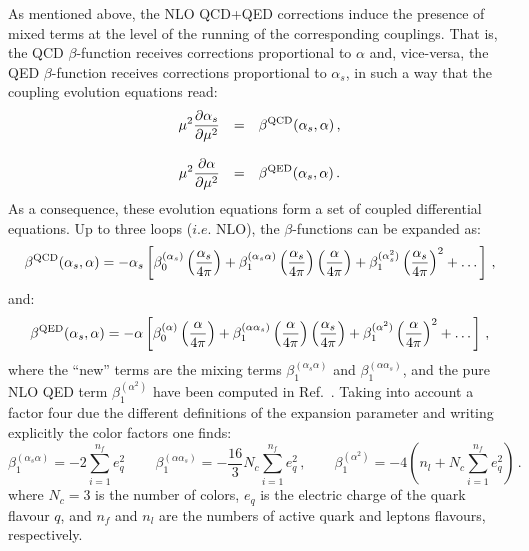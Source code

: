 As mentioned above, the NLO QCD+QED corrections induce the presence of
mixed terms at the level of the running of the corresponding
couplings.
%
That is, the QCD $\beta$-function receives corrections proportional to
$\alpha$ and, vice-versa, the QED $\beta$-function receives
corrections proportional to $\alpha_s$, in such a way that the
coupling evolution equations read:
\begin{equation}\label{CoupledEq}
\begin{array}{rcl}
\displaystyle \mu^2\frac{\partial \alpha_s}{\partial \mu^2} &=& \displaystyle
                                                \beta^{\rm QCD}(\alpha_s,\alpha)\,,\\
\\
\displaystyle \mu^2\frac{\partial \alpha}{\partial \mu^2} &=& \displaystyle \beta^{\rm QED}(\alpha_s,\alpha)\,.
\end{array}
\end{equation}
As a consequence, these evolution equations form a set of coupled
differential equations. Up to three loops ($i.e.$ NLO), the
$\beta$-functions can be expanded as:
\begin{equation}
\beta^{\rm QCD}(\alpha_s,\alpha) = -\alpha_s\left[\beta_0^{(\alpha_s)}\left(\frac{\alpha_s}{4\pi}\right)+\beta_1^{(\alpha_s\alpha)}\left(\frac{\alpha_s}{4\pi}\right) \left(\frac{\alpha}{4\pi}\right)+\beta_1^{(\alpha_s^2)}\left(\frac{\alpha_s}{4\pi}\right)^2+\dots\right]\,,
\end{equation}
and:
\begin{equation}
\beta^{\rm QED}(\alpha_s,\alpha) = -\alpha\left[\beta_0^{(\alpha)}\left(\frac{\alpha}{4\pi}\right)+\beta_1^{(\alpha\alpha_s)}\left(\frac{\alpha}{4\pi}\right) \left(\frac{\alpha_s}{4\pi}\right)+\beta_1^{(\alpha^2)}\left(\frac{\alpha}{4\pi}\right)^2+\dots\right]\,,
\end{equation}
where the ``new'' terms are the mixing terms
$\beta_1^{(\alpha_s\alpha)}$ and $\beta_1^{(\alpha\alpha_s)}$, and the
pure NLO QED term $\beta_1^{(\alpha^2)}$ have been computed in
Ref.~\cite{Surguladze:1996hx}. Taking into account a factor four due
the different definitions of the expansion parameter and writing
explicitly the color factors one finds:
\begin{equation}\label{eq:NewBetaTerms}
\beta_1^{(\alpha_s\alpha)} = -2\sum_{i=1}^{n_f}
e_q^2\,\qquad\beta_1^{(\alpha\alpha_s)} = -\frac{16}{3}N_c\sum_{i=1}^{n_f} e_q^2\,,\qquad \beta_1^{(\alpha^2)} = -4\left(n_l+N_c\sum_{i=1}^{n_f} e_q^2\right)\,.
\end{equation}
where $N_c=3$ is the number of colors, $e_q$ is the electric charge of
the quark flavour $q$, and $n_f$ and $n_l$ are the numbers of active
quark and leptons flavours, respectively.

